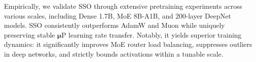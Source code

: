 Empirically, we validate SSO through extensive pretraining experiments across various scales, including Dense 1.7B, MoE 8B-A1B, and 200-layer DeepNet models. SSO consistently outperforms AdamW and Muon while uniquely preserving stable $\boldsymbol{\mu}$P learning rate transfer. Notably, it yields superior training dynamics: it significantly improves MoE router load balancing, suppresses outliers in deep networks, and strictly bounds activations within a tunable scale.
